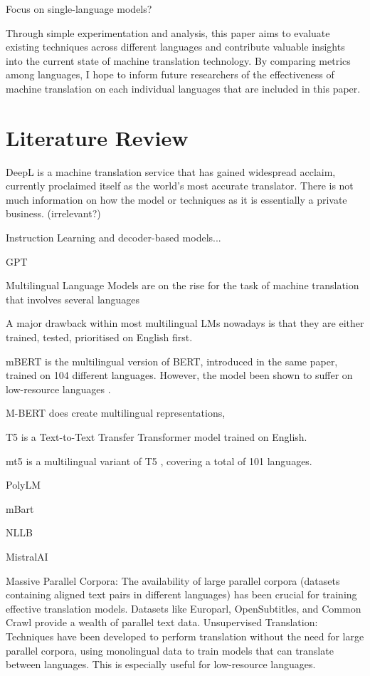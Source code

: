 \documentclass[a4paper]{article}
\begin{document}
Focus on single-language models?

Through simple experimentation and analysis, this paper aims to evaluate existing techniques across different languages
and contribute valuable insights into the current state of machine translation technology. By comparing metrics among languages, I hope to inform future researchers of the effectiveness of machine translation on each individual languages that are included in this paper.

\section{Literature Review}

DeepL \cite{deepl} is a machine translation service that has gained widespread acclaim, currently proclaimed itself as the world's most accurate translator. There is not much information on how the model or techniques as it is essentially a private business. (irrelevant?)


Instruction Learning and decoder-based models...

GPT \cite{openai-2024-gpt4}

Multilingual Language Models are on the rise for the task of machine translation that involves several languages

A major drawback within most multilingual LMs nowadays is that they are either trained, tested, prioritised on English first.


mBERT \cite{devlin-2019-bert} is the multilingual version of BERT, introduced in the same paper, trained on 104 different languages. However, the model been shown to suffer on low-resource languages \cite{wu-2020-mbert-are-all}.

M-BERT
does create multilingual representations,

T5 \cite{raffel-2023-t5} is a Text-to-Text Transfer Transformer model trained on English.

mt5 \cite{xue-2021-mt5} is a multilingual variant of T5 \cite{raffel-2023-t5}, covering a total of 101 languages.

PolyLM \cite{wei-2023-polylm}

mBart \cite{liu-2020-mbart}

NLLB \cite{nllb200}

MistralAI \cite{jiang-2023-mistral-7b}


Massive Parallel Corpora: The availability of large parallel corpora (datasets containing aligned text pairs in different languages) has been crucial for training effective translation models. Datasets like Europarl, OpenSubtitles, and Common Crawl provide a wealth of parallel text data.
Unsupervised Translation: Techniques have been developed to perform translation without the need for large parallel corpora, using monolingual data to train models that can translate between languages. This is especially useful for low-resource languages.
\end{document}
